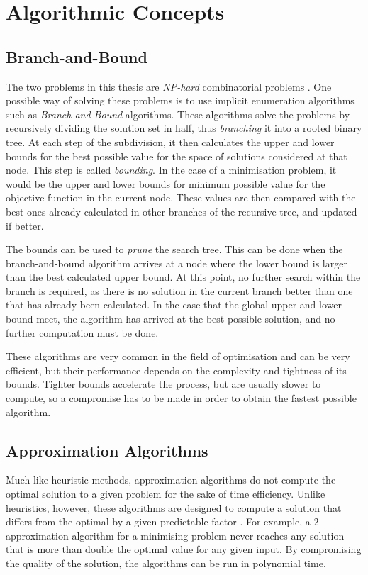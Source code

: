 \section{Algorithmic Concepts}
\subsection{Branch-and-Bound}
The two problems in this thesis are \emph{NP-hard} combinatorial problems \cite{complex,gdccomplex}. One possible way of solving these problems is to use implicit enumeration algorithms such as \emph{Branch-and-Bound} algorithms.
These algorithms solve the problems by recursively dividing the solution set in half, thus \emph{branching} it into a rooted binary tree.
At each step of the subdivision, it then calculates the upper and lower bounds for the best possible value for the space of solutions considered at that node. This step is called \emph{bounding}.
In the case of a minimisation problem, it would be the upper and lower bounds for minimum possible value for the objective function in the current node. These values are then compared with the best ones already calculated in other branches of the recursive tree, and updated if better.

The bounds can be used to \emph{prune} the search tree. This can be done when the branch-and-bound algorithm arrives at a node where the lower bound is larger than the best calculated upper bound. At this point, no further search within the branch is required, as there is no solution in the current branch better than one that has already been calculated. 
In the case that the global upper and lower bound meet, the algorithm has arrived at the best possible solution, and no further computation must be done.

These algorithms are very common in the field of optimisation and can be very efficient, but their performance depends on the complexity and tightness of its bounds. Tighter bounds accelerate the process, but are usually slower to compute, so a compromise has to be made in order to obtain the fastest possible algorithm.

\subsection{Approximation Algorithms}
Much like heuristic methods, approximation algorithms do not compute the optimal solution to a given problem for the sake of time efficiency. Unlike heuristics, however, these algorithms are designed to compute a solution that differs from the optimal by a given predictable factor \cite{approxalgos}. For example, a 2-approximation algorithm for a minimising problem never reaches any solution that is more than double the optimal value for any given input. By compromising the quality of the solution, the algorithms can be run in polynomial time. 

